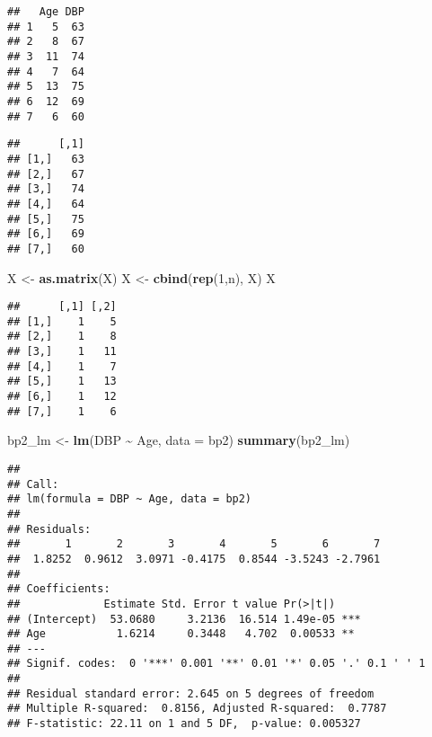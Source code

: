 \documentclass[
]{article}
\newenvironment{Shaded}{\begin{snugshade}}{\end{snugshade}}
\newcommand{\AttributeTok}[1]{\textcolor[rgb]{0.13,0.29,0.53}{#1}}
\newcommand{\DecValTok}[1]{\textcolor[rgb]{0.00,0.00,0.81}{#1}}
\newcommand{\FunctionTok}[1]{\textcolor[rgb]{0.13,0.29,0.53}{\textbf{#1}}}
\newcommand{\NormalTok}[1]{#1}
\newcommand{\OtherTok}[1]{\textcolor[rgb]{0.56,0.35,0.01}{#1}}
\newcommand{\SpecialCharTok}[1]{\textcolor[rgb]{0.81,0.36,0.00}{\textbf{#1}}}
\begin{document}
\begin{verbatim}
##   Age DBP
## 1   5  63
## 2   8  67
## 3  11  74
## 4   7  64
## 5  13  75
## 6  12  69
## 7   6  60
\end{verbatim}

\begin{Shaded}
\end{Shaded}

\begin{verbatim}
##      [,1]
## [1,]   63
## [2,]   67
## [3,]   74
## [4,]   64
## [5,]   75
## [6,]   69
## [7,]   60
\end{verbatim}

\begin{Shaded}
\begin{Highlighting}[]
\NormalTok{X }\OtherTok{\textless{}{-}} \FunctionTok{as.matrix}\NormalTok{(X)}
\NormalTok{X }\OtherTok{\textless{}{-}} \FunctionTok{cbind}\NormalTok{(}\FunctionTok{rep}\NormalTok{(}\DecValTok{1}\NormalTok{,n), X)}
\NormalTok{X}
\end{Highlighting}
\end{Shaded}

\begin{verbatim}
##      [,1] [,2]
## [1,]    1    5
## [2,]    1    8
## [3,]    1   11
## [4,]    1    7
## [5,]    1   13
## [6,]    1   12
## [7,]    1    6
\end{verbatim}

\begin{Shaded}
\begin{Highlighting}[]
\NormalTok{bp2\_lm }\OtherTok{\textless{}{-}} \FunctionTok{lm}\NormalTok{(DBP }\SpecialCharTok{\textasciitilde{}}\NormalTok{ Age, }\AttributeTok{data =}\NormalTok{ bp2)}
\FunctionTok{summary}\NormalTok{(bp2\_lm)}
\end{Highlighting}
\end{Shaded}

\begin{verbatim}
## 
## Call:
## lm(formula = DBP ~ Age, data = bp2)
## 
## Residuals:
##       1       2       3       4       5       6       7 
##  1.8252  0.9612  3.0971 -0.4175  0.8544 -3.5243 -2.7961 
## 
## Coefficients:
##             Estimate Std. Error t value Pr(>|t|)    
## (Intercept)  53.0680     3.2136  16.514 1.49e-05 ***
## Age           1.6214     0.3448   4.702  0.00533 ** 
## ---
## Signif. codes:  0 '***' 0.001 '**' 0.01 '*' 0.05 '.' 0.1 ' ' 1
## 
## Residual standard error: 2.645 on 5 degrees of freedom
## Multiple R-squared:  0.8156, Adjusted R-squared:  0.7787 
## F-statistic: 22.11 on 1 and 5 DF,  p-value: 0.005327
\end{verbatim}
\end{document}
